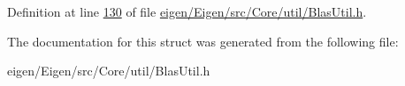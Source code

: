Definition at line \hyperlink{eigen_2_eigen_2src_2_core_2util_2_blas_util_8h_source_l00130}{130} of file \hyperlink{eigen_2_eigen_2src_2_core_2util_2_blas_util_8h_source}{eigen/\+Eigen/src/\+Core/util/\+Blas\+Util.\+h}.



The documentation for this struct was generated from the following file\+:\begin{DoxyCompactItemize}
\item 
eigen/\+Eigen/src/\+Core/util/\+Blas\+Util.\+h\end{DoxyCompactItemize}
